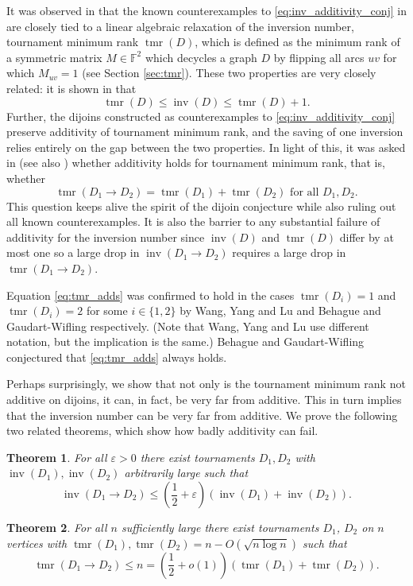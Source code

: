 \documentclass[a4paper, 12pt, reqno]{amsart}
\numberwithin{equation}{section}
\theoremstyle{plain}
\newtheorem{thm}{Theorem}[section]
\theoremstyle{remark}
\theoremstyle{definition}
\newcommand{\lb}{\left(}
\newcommand{\rb}{\right)}
\renewcommand{\epsilon}{\varepsilon}
\newcommand{\e}{\epsilon}
\newcommand{\tmr}{\operatorname{tmr}}
\newcommand{\inv}{\operatorname{inv}}
\begin{document}
It was observed in \cite{Natnote} that the known counterexamples to \eqref{eq:inv_additivity_conj} in \cite{Alon,Problems} are closely tied to a linear algebraic relaxation of the inversion number, tournament minimum rank $\tmr(D)$, which is defined as the minimum rank of a symmetric matrix $M \in \mathbb{F}^2$ which decycles a graph $D$ by flipping all arcs $uv$ for which $M_{uv} = 1$ (see Section \ref{sec:tmr}). These two properties are very closely related: it is shown in \cite{Natnote} that
\begin{equation}
    \tmr(D) \leq \inv(D) \leq \tmr(D) + 1.  \label{rel}
\end{equation}
Further, the dijoins constructed as counterexamples to \eqref{eq:inv_additivity_conj}  preserve additivity of tournament minimum rank, and the saving of one inversion relies entirely on the gap between the two properties. In light of this, it was asked in \cite[Question 17]{Natnote} (see also \cite[Problem 30.2]{BCC}) whether additivity holds for tournament minimum rank, that is, whether
\begin{equation}
    \tmr(D_1 \to D_2) = \tmr(D_1) + \tmr(D_2) \text{ for all }D_1,D_2. \label{eq:tmr_adds}
\end{equation}
 This question keeps alive the spirit of the dijoin conjecture while also ruling out all known counterexamples. It is also the barrier to any substantial failure of additivity for the inversion number since $\inv(D)$ and $\tmr(D)$ differ by at most one so a large drop in $\inv(D_1 \to D_2)$ requires a large drop in $\tmr(D_1 \to D_2)$.
 
Equation \eqref{eq:tmr_adds} was confirmed to hold in the cases $\tmr(D_i) = 1$ and  $\tmr(D_i) = 2$  for some $i \in \{1,2\}$ by Wang, Yang and Lu \cite{Wang} and Behague and Gaudart-Wifling \cite{natcase} respectively. (Note that Wang, Yang and Lu \cite{Wang}  use different notation, but the implication is the same.) 
Behague and Gaudart-Wifling \cite[Conjecture 6.1]{natcase} conjectured that \eqref{eq:tmr_adds} always holds.

Perhaps surprisingly, we show that not only is the tournament minimum rank not additive on dijoins, it can, in fact, be very far from additive. This in turn implies that the inversion number can be very far from additive. We prove the following two related theorems, which show how badly additivity can fail.
\begin{thm} \label{T1}
    For all $\e>0$ there exist tournaments $D_1, D_2$ with $\inv(D_1),\inv(D_2)$ arbitrarily large such that
    \begin{equation*}
        \inv(D_1 \to D_2) \leq \lb\frac{1}{2} +\e\rb(\inv(D_1)+\inv(D_2)).
    \end{equation*}
\end{thm}
\bigskip 
\begin{thm} \label{T2}
    For all $n$ sufficiently large there exist tournaments $D_1$, $D_2$ on $n$ vertices with $\tmr(D_1),\tmr(D_2) = n - O(\sqrt{n\log{n}})$ such that 
    \begin{equation*}
       \tmr(D_1 \to D_2) \le n = \lb\frac{1}{2} +o(1)\rb(\tmr(D_1)+\tmr(D_2)).
    \end{equation*}
\end{thm}
\end{document}
